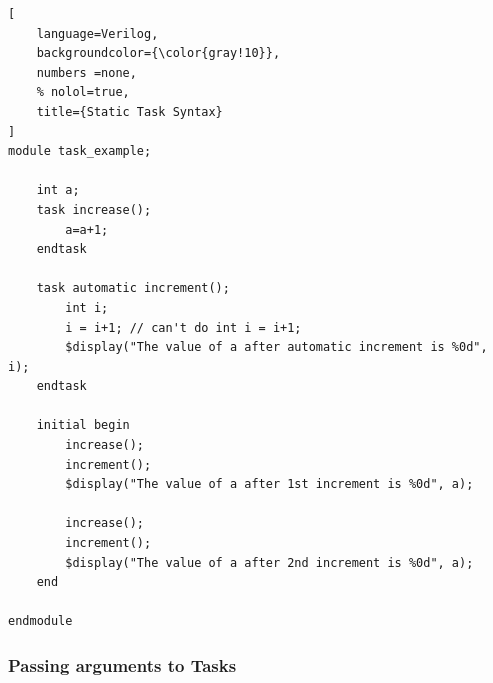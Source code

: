 \documentclass[12pt, a4paper]{article}
\begin{document}
\begin{lstlisting}[
    language=Verilog,
    backgroundcolor={\color{gray!10}},
    numbers =none,
    % nolol=true,
    title={Static Task Syntax}
]
module task_example;

    int a;
    task increase();
        a=a+1;
    endtask

    task automatic increment();
        int i;
        i = i+1; // can't do int i = i+1;
        $display("The value of a after automatic increment is %0d", i);
    endtask

    initial begin
        increase();
        increment();
        $display("The value of a after 1st increment is %0d", a);
        
        increase();
        increment();
        $display("The value of a after 2nd increment is %0d", a);
    end
    
endmodule
\end{lstlisting}


\subsubsection{Passing arguments to Tasks}
\end{document}
